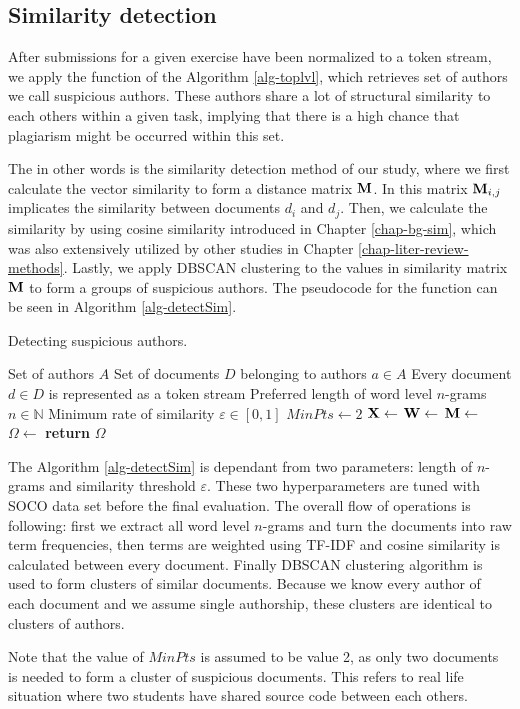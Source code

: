 \subsection{Similarity detection}


After submissions for a given exercise have been normalized to a token stream, we apply the  function of the Algorithm \ref{alg-toplvl}, which retrieves set of authors we call suspicious authors. These authors share a lot of structural similarity to each others within a given task, implying that there is a high chance that plagiarism might be occurred within this set. 

The  in other words is the similarity detection method of our study, where we first calculate the vector similarity to form a distance matrix $\mathbf{M}$. In this matrix $\mathbf{M}_{i,j}$ implicates the similarity between documents $d_i$ and $d_j$. Then, we calculate the similarity by using cosine similarity introduced in Chapter \ref{chap-bg-sim}, which was also extensively utilized by other studies in Chapter \ref{chap-liter-review-methods}. Lastly, we apply DBSCAN clustering to the values in similarity matrix $\mathbf{M}$ to form a groups of suspicious authors. The pseudocode for the  function can be seen in Algorithm \ref{alg-detectSim}.

\begin{algorithm}[ht]
\caption{Detecting suspicious authors.}
\label{alg-detectSim}
\begin{algorithmic}

\Require Set of authors $A$
\Require Set of documents $D$ belonging to authors $a \in A$
\Require Every document $d \in D$ is represented as a token stream
\Require Preferred length of word level $n$-grams $n \in \mathbb{N}$
\Require Minimum rate of similarity $\varepsilon \in [0, 1]$
\Assume $MinPts \gets 2$
   \State $\mathbf{X} \gets$ 
   \State $\mathbf{W} \gets$ 
   \State $\mathbf{M} \gets$ 
   \State $\Omega \gets$ 
   \State \textbf{return} $\Omega$
\EndProcedure
\end{algorithmic}
\end{algorithm}

\noindent
The Algorithm \ref{alg-detectSim} is dependant from two parameters: length of $n$-grams and similarity threshold $\varepsilon$. These two hyperparameters are tuned with SOCO data set before the final evaluation. The overall flow of operations is following: first we extract all word level $n$-grams and turn the documents into raw term frequencies, then terms are weighted using TF-IDF and cosine similarity is calculated between every document. Finally DBSCAN clustering algorithm is used to form clusters of similar documents. Because we know every author of each document and we assume single authorship, these clusters are identical to clusters of authors. 

Note that the value of $MinPts$ is assumed to be value 2, as only two documents is needed to form a cluster of suspicious documents. This refers to real life situation where two students have shared source code between each others. 